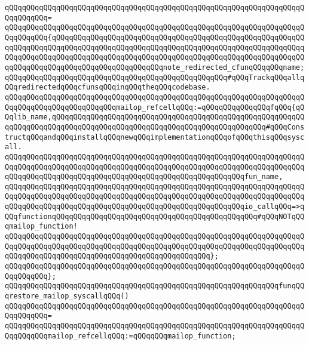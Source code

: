\verb|qQQqqQQqqQQqqQQqqQQqqQQqqQQqqQQqqQQqqQQqqQQqqQQqqQQqqQQqqQQqqQQqqQQqqQQqqQQqqQQq=|\newline
\verb|qQQqqQQqqQQqqQQqqQQqqQQqqQQqqQQqqQQqqQQqqQQqqQQqqQQqqQQqqQQqqQQqqQQqqQQqqQQqqQQq{qQQqqQQqqQQqqQQqqQQqqQQqqQQqqQQqqQQqqQQqqQQqqQQqqQQqqQQqqQQqqQQqqQQqqQQqqQQqqQQqqQQqqQQqqQQqqQQqqQQqqQQqqQQqqQQqqQQqqQQqqQQqqQQqqQQqqQQqqQQqqQQqqQQqqQQqqQQqqQQqqQQqqQQqqQQqqQQqqQQqqQQqqQQqqQQqqQQqqQQqqQQqqQQqqQQqqQQqqQQqqQQqqQQqqQQqqQQqnote_redirected_cfunqQQqqQQqname;qQQqqQQqqQQqqQQqqQQqqQQqqQQqqQQqqQQqqQQqqQQqqQQqqQQq#qQQqTrackqQQqallqQQqredirectedqQQqcfunsqQQqinqQQqtheqQQqcodebase.|\newline
\newline
\verb|qQQqqQQqqQQqqQQqqQQqqQQqqQQqqQQqqQQqqQQqqQQqqQQqqQQqqQQqqQQqqQQqqQQqqQQqqQQqqQQqqQQqqQQqqQQqqQQqmailop_refcellqQQq:=qQQqqQQqqQQqqQQqfqQQq{qQQqlib_name,qQQqqQQqqQQqqQQqqQQqqQQqqQQqqQQqqQQqqQQqqQQqqQQqqQQqqQQqqQQqqQQqqQQqqQQqqQQqqQQqqQQqqQQqqQQqqQQqqQQqqQQqqQQqqQQqqQQqqQQq#qQQqConstructqQQqandqQQqinstallqQQqnewqQQqimplementationqQQqofqQQqthisqQQqsyscall.|\newline
\verb|qQQqqQQqqQQqqQQqqQQqqQQqqQQqqQQqqQQqqQQqqQQqqQQqqQQqqQQqqQQqqQQqqQQqqQQqqQQqqQQqqQQqqQQqqQQqqQQqqQQqqQQqqQQqqQQqqQQqqQQqqQQqqQQqqQQqqQQqqQQqqQQqqQQqqQQqqQQqqQQqqQQqqQQqqQQqqQQqqQQqqQQqqQQqqQQqqQQqfun_name,|\newline
\verb|qQQqqQQqqQQqqQQqqQQqqQQqqQQqqQQqqQQqqQQqqQQqqQQqqQQqqQQqqQQqqQQqqQQqqQQqqQQqqQQqqQQqqQQqqQQqqQQqqQQqqQQqqQQqqQQqqQQqqQQqqQQqqQQqqQQqqQQqqQQqqQQqqQQqqQQqqQQqqQQqqQQqqQQqqQQqqQQqqQQqqQQqqQQqqQQqqQQqio_callqQQq=>qQQqfunctionqQQqqQQqqQQqqQQqqQQqqQQqqQQqqQQqqQQqqQQqqQQqqQQq#qQQqNOTqQQqmailop_function!|\newline
\verb|qQQqqQQqqQQqqQQqqQQqqQQqqQQqqQQqqQQqqQQqqQQqqQQqqQQqqQQqqQQqqQQqqQQqqQQqqQQqqQQqqQQqqQQqqQQqqQQqqQQqqQQqqQQqqQQqqQQqqQQqqQQqqQQqqQQqqQQqqQQqqQQqqQQqqQQqqQQqqQQqqQQqqQQqqQQqqQQqqQQqqQQqqQQq};|\newline
\verb|qQQqqQQqqQQqqQQqqQQqqQQqqQQqqQQqqQQqqQQqqQQqqQQqqQQqqQQqqQQqqQQqqQQqqQQqqQQqqQQq};|\newline
\newline
\verb|qQQqqQQqqQQqqQQqqQQqqQQqqQQqqQQqqQQqqQQqqQQqqQQqqQQqqQQqqQQqqQQqfunqQQqrestore_mailop_syscallqQQq()|\newline
\verb|qQQqqQQqqQQqqQQqqQQqqQQqqQQqqQQqqQQqqQQqqQQqqQQqqQQqqQQqqQQqqQQqqQQqqQQqqQQqqQQq=|\newline
\verb|qQQqqQQqqQQqqQQqqQQqqQQqqQQqqQQqqQQqqQQqqQQqqQQqqQQqqQQqqQQqqQQqqQQqqQQqqQQqqQQqmailop_refcellqQQq:=qQQqqQQqmailop_function;|\newline
